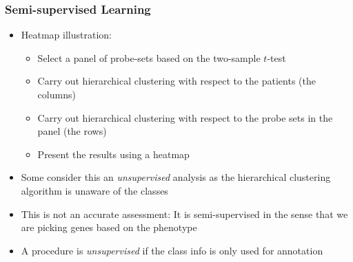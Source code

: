 \documentclass[xcolor=x11names,compress]{beamer}\usepackage[]{graphicx}\usepackage[]{color}
\begin{document}
\begin{frame}
  \frametitle{Semi-supervised Learning}
  \begin{itemize}
\item Heatmap illustration:
  \begin{itemize}
  \item Select a panel of probe-sets based on the two-sample $t$-test
  \item Carry out hierarchical clustering with respect to the patients (the columns)
  \item Carry out hierarchical clustering with respect to the probe sets in the panel (the rows)
  \item Present the results using a heatmap
  \end{itemize}
\item Some consider this an {\it unsupervised} analysis as the hierarchical clustering algorithm
      is unaware of the classes
\item This is not an accurate assessment: It is semi-supervised in the sense that we are picking
      genes based on the phenotype
\item A procedure is {\it unsupervised} if the class info is only used for annotation
\end{itemize}
\end{frame}
\end{document}
